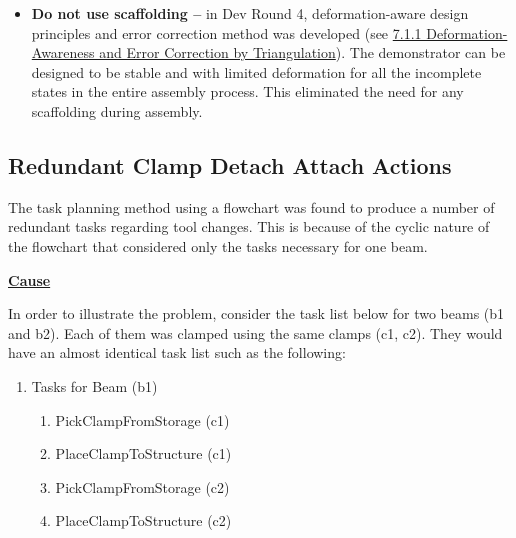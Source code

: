 {\begin{itemize}
\begin{itemize}
	\item Existing research literature in autonomous robotics have developed many different techniques for sensing and replanning. \parencite{elbanhawiSamplingBasedRobotMotion2014} However, due to the lack of expertise in these fields, the development was not pursued.

\end{itemize}
	\item \textbf{Do not use scaffolding --} in Dev Round 4, deformation-aware design principles and error correction method was developed (see \ul{7.1.1 Deformation-Awareness and Error Correction by Triangulation}). The demonstrator can be designed to be stable and with limited deformation for all the incomplete states in the entire assembly process. This eliminated the need for any scaffolding during assembly. 

\end{itemize}
\subsection{Redundant Clamp Detach Attach Actions}

The task planning method using a flowchart was found to produce a number of redundant tasks regarding tool changes. This is because of the cyclic nature of the flowchart that considered only the tasks necessary for one beam. 

\textbf{\ul{Cause}}

In order to illustrate the problem, consider the task list below for two beams (b1 and b2). Each of them was clamped using the same clamps (c1, c2). They would have an almost identical task list such as the following:

\begin{enumerate}
	\item {\footnotesize Tasks for Beam (b1) }

\begin{enumerate}
	\item {\footnotesize PickClampFromStorage (c1)}

	\item {\footnotesize PlaceClampToStructure (c1)}

	\item {\footnotesize PickClampFromStorage (c2)}

	\item {\footnotesize PlaceClampToStructure (c2)}


\end{enumerate}
\end{enumerate}}
